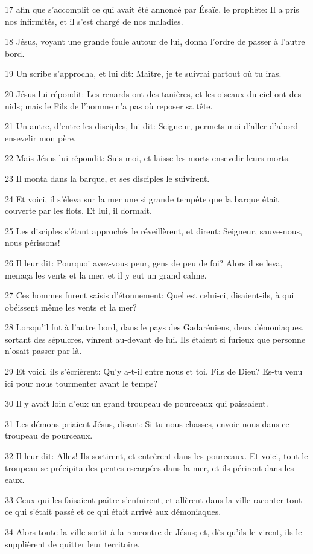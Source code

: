 \par 17 afin que s'accomplît ce qui avait été annoncé par Ésaïe, le prophète: Il a pris nos infirmités, et il s'est chargé de nos maladies.
\par 18 Jésus, voyant une grande foule autour de lui, donna l'ordre de passer à l'autre bord.
\par 19 Un scribe s'approcha, et lui dit: Maître, je te suivrai partout où tu iras.
\par 20 Jésus lui répondit: Les renards ont des tanières, et les oiseaux du ciel ont des nids; mais le Fils de l'homme n'a pas où reposer sa tête.
\par 21 Un autre, d'entre les disciples, lui dit: Seigneur, permets-moi d'aller d'abord ensevelir mon père.
\par 22 Mais Jésus lui répondit: Suis-moi, et laisse les morts ensevelir leurs morts.
\par 23 Il monta dans la barque, et ses disciples le suivirent.
\par 24 Et voici, il s'éleva sur la mer une si grande tempête que la barque était couverte par les flots. Et lui, il dormait.
\par 25 Les disciples s'étant approchés le réveillèrent, et dirent: Seigneur, sauve-nous, nous périssons!
\par 26 Il leur dit: Pourquoi avez-vous peur, gens de peu de foi? Alors il se leva, menaça les vents et la mer, et il y eut un grand calme.
\par 27 Ces hommes furent saisis d'étonnement: Quel est celui-ci, disaient-ils, à qui obéissent même les vents et la mer?
\par 28 Lorsqu'il fut à l'autre bord, dans le pays des Gadaréniens, deux démoniaques, sortant des sépulcres, vinrent au-devant de lui. Ils étaient si furieux que personne n'osait passer par là.
\par 29 Et voici, ils s'écrièrent: Qu'y a-t-il entre nous et toi, Fils de Dieu? Es-tu venu ici pour nous tourmenter avant le temps?
\par 30 Il y avait loin d'eux un grand troupeau de pourceaux qui paissaient.
\par 31 Les démons priaient Jésus, disant: Si tu nous chasses, envoie-nous dans ce troupeau de pourceaux.
\par 32 Il leur dit: Allez! Ils sortirent, et entrèrent dans les pourceaux. Et voici, tout le troupeau se précipita des pentes escarpées dans la mer, et ils périrent dans les eaux.
\par 33 Ceux qui les faisaient paître s'enfuirent, et allèrent dans la ville raconter tout ce qui s'était passé et ce qui était arrivé aux démoniaques.
\par 34 Alors toute la ville sortit à la rencontre de Jésus; et, dès qu'ils le virent, ils le supplièrent de quitter leur territoire.

